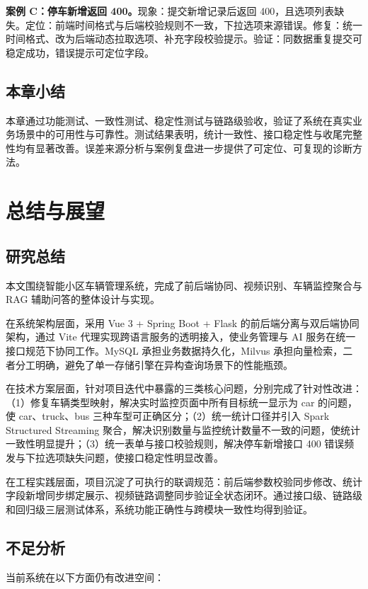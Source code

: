 \documentclass{wzuthesis} %
\begin{document}
\textbf{案例 C：停车新增返回 400。}现象：提交新增记录后返回 400，且选项列表缺失。定位：前端时间格式与后端校验规则不一致，下拉选项来源错误。修复：统一时间格式、改为后端动态拉取选项、补充字段校验提示。验证：同数据重复提交可稳定成功，错误提示可定位字段。


\section{本章小结}

本章通过功能测试、一致性测试、稳定性测试与链路级验收，验证了系统在真实业务场景中的可用性与可靠性。测试结果表明，统计一致性、接口稳定性与收尾完整性均有显著改善。误差来源分析与案例复盘进一步提供了可定位、可复现的诊断方法。

\chapter{总结与展望}

\section{研究总结}

本文围绕智能小区车辆管理系统，完成了前后端协同、视频识别、车辆监控聚合与 RAG 辅助问答的整体设计与实现。

在系统架构层面，采用 Vue 3 + Spring Boot + Flask 的前后端分离与双后端协同架构，通过 Vite 代理实现跨语言服务的透明接入，使业务管理与 AI 服务在统一接口规范下协同工作。MySQL 承担业务数据持久化，Milvus 承担向量检索，二者分工明确，避免了单一存储引擎在异构查询场景下的性能瓶颈。

在技术方案层面，针对项目迭代中暴露的三类核心问题，分别完成了针对性改进：（1）修复车辆类型映射，解决实时监控页面中所有目标统一显示为 car 的问题，使 car、truck、bus 三种车型可正确区分；（2）统一统计口径并引入 Spark Structured Streaming 聚合，解决识别数量与监控统计数量不一致的问题，使统计一致性明显提升；（3）统一表单与接口校验规则，解决停车新增接口 400 错误频发与下拉选项缺失问题，使接口稳定性明显改善。

在工程实践层面，项目沉淀了可执行的联调规范：前后端参数校验同步修改、统计字段新增同步绑定展示、视频链路调整同步验证全状态闭环。通过接口级、链路级和回归级三层测试体系，系统功能正确性与跨模块一致性均得到验证。

\section{不足分析}

当前系统在以下方面仍有改进空间：
\end{document}
